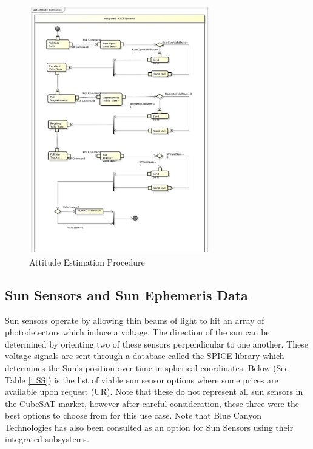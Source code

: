 \documentclass[conf]{new-aiaa}
\begin{document}
\begin{figure}[H]
\centering
\includegraphics[width=0.70\textwidth]{Figures/AE_AD.png}
\caption{Attitude Estimation Procedure}
\label{fig:AE_AD}
\end{figure}

\subsection{Sun Sensors and Sun Ephemeris Data}

Sun sensors operate by allowing thin beams of light to hit an array of photodetectors which induce a voltage. The direction of the sun can be determined by orienting two of these sensors perpendicular to one another. These voltage signals are sent through a database called the SPICE library which determines the Sun's position over time in spherical coordinates. Below (See Table \ref{t:SS}) is the list of viable sun sensor options where some prices are available upon request (UR). Note that these do not represent all sun sensors in the CubeSAT market, however after careful consideration, these three were the best options to choose from for this use case. Note that Blue Canyon Technologies has also been consulted as an option for Sun Sensors using their integrated subsystems.
\end{document}
